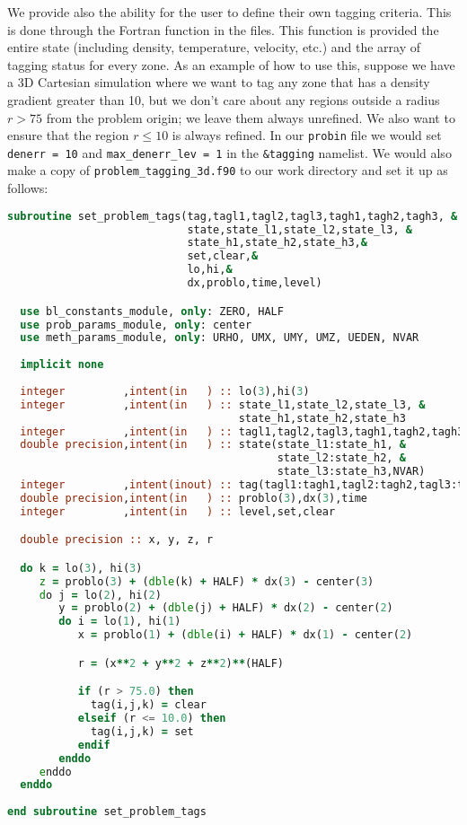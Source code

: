 We provide also the ability for the user to define their own tagging criteria.
This is done through the Fortran function  in the 
 files. This function is provided the entire 
state (including density, temperature, velocity, etc.) and the array 
of tagging status for every zone. As an example of how to use this, suppose we 
have a 3D Cartesian simulation where we want to tag any zone that has a 
density gradient greater than 10, but we don't care about any regions 
outside a radius $r > 75$ from the problem origin; we leave them always unrefined. 
We also want to ensure that the region $r \leq 10$ is always refined.
In our {\tt probin} file we would set {\tt denerr = 10} and {\tt max\_denerr\_lev = 1}
in the {\tt \&tagging} namelist. We would also make a copy of 
{\tt problem\_tagging\_3d.f90} to our work directory and set it up as follows:
\begin{lstlisting}[language=fortran]
subroutine set_problem_tags(tag,tagl1,tagl2,tagl3,tagh1,tagh2,tagh3, &
                            state,state_l1,state_l2,state_l3, &
                            state_h1,state_h2,state_h3,&
                            set,clear,&
                            lo,hi,&
                            dx,problo,time,level)

  use bl_constants_module, only: ZERO, HALF
  use prob_params_module, only: center
  use meth_params_module, only: URHO, UMX, UMY, UMZ, UEDEN, NVAR
 
  implicit none
  
  integer         ,intent(in   ) :: lo(3),hi(3)
  integer         ,intent(in   ) :: state_l1,state_l2,state_l3, &
                                    state_h1,state_h2,state_h3
  integer         ,intent(in   ) :: tagl1,tagl2,tagl3,tagh1,tagh2,tagh3
  double precision,intent(in   ) :: state(state_l1:state_h1, &
                                          state_l2:state_h2, &
                                          state_l3:state_h3,NVAR)
  integer         ,intent(inout) :: tag(tagl1:tagh1,tagl2:tagh2,tagl3:tagh3)
  double precision,intent(in   ) :: problo(3),dx(3),time
  integer         ,intent(in   ) :: level,set,clear

  double precision :: x, y, z, r

  do k = lo(3), hi(3)
     z = problo(3) + (dble(k) + HALF) * dx(3) - center(3)
     do j = lo(2), hi(2)
        y = problo(2) + (dble(j) + HALF) * dx(2) - center(2)
        do i = lo(1), hi(1)
           x = problo(1) + (dble(i) + HALF) * dx(1) - center(2)

           r = (x**2 + y**2 + z**2)**(HALF)

           if (r > 75.0) then
             tag(i,j,k) = clear
           elseif (r <= 10.0) then
             tag(i,j,k) = set
           endif
        enddo
     enddo
  enddo
  
end subroutine set_problem_tags
\end{lstlisting}

